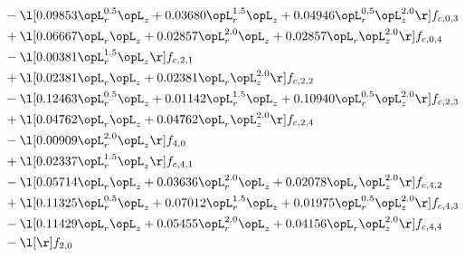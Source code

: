 \begin{alignat}{2}
& - \l[  0.09853 \opL_r^{0.5} \opL_z +  0.03680 \opL_r^{1.5} \opL_z +  0.04946 \opL_r^{0.5} \opL_z^{2.0}  \r] f_{c,0,3} \nonumber \\ 
& + \l[  0.06667 \opL_r \opL_z +  0.02857 \opL_r^{2.0} \opL_z +  0.02857 \opL_r \opL_z^{2.0}  \r] f_{c,0,4} \nonumber \\ 
& - \l[  0.00381 \opL_r^{1.5} \opL_z  \r] f_{c,2,1} \nonumber \\ 
& + \l[  0.02381 \opL_r \opL_z +  0.02381 \opL_r \opL_z^{2.0}  \r] f_{c,2,2} \nonumber \\ 
& - \l[  0.12463 \opL_r^{0.5} \opL_z +  0.01142 \opL_r^{1.5} \opL_z +  0.10940 \opL_r^{0.5} \opL_z^{2.0}  \r] f_{c,2,3} \nonumber \\ 
& + \l[  0.04762 \opL_r \opL_z +  0.04762 \opL_r \opL_z^{2.0}  \r] f_{c,2,4} \nonumber \\ 
& - \l[  0.00909 \opL_r^{2.0} \opL_z  \r] f_{4,0} \nonumber \\ 
& + \l[  0.02337 \opL_r^{1.5} \opL_z  \r] f_{c,4,1} \nonumber \\ 
& - \l[  0.05714 \opL_r \opL_z +  0.03636 \opL_r^{2.0} \opL_z +  0.02078 \opL_r \opL_z^{2.0}  \r] f_{c,4,2} \nonumber \\ 
& + \l[  0.11325 \opL_r^{0.5} \opL_z +  0.07012 \opL_r^{1.5} \opL_z +  0.01975 \opL_r^{0.5} \opL_z^{2.0}  \r] f_{c,4,3} \nonumber \\ 
& - \l[  0.11429 \opL_r \opL_z +  0.05455 \opL_r^{2.0} \opL_z +  0.04156 \opL_r \opL_z^{2.0}  \r] f_{c,4,4} \nonumber \\ 
& - \l[  \r] f_{2,0} \nonumber \\ 
\end{alignat} 


